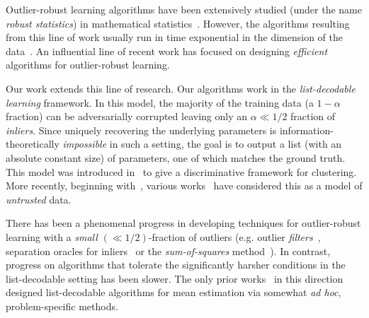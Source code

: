 \documentclass{article}
\theoremstyle{definition}
\theoremstyle{remark}
\numberwithin{equation}{section}
\newcommand{\1}{\bm{1}}
\begin{document}
Outlier-robust learning algorithms have been extensively studied (under the name \emph{robust statistics}) in mathematical statistics~\cite{MR0426989,maronna2006robust,huber2011robust,hampel2011robust}. However, the algorithms resulting from this line of work usually run in time exponential in the dimension of the data~\cite{bernholt2006robust}. An influential line of recent work \cite{journals/jmlr/KlivansLS09,journals/corr/AwasthiBL13, DBLP:journals/corr/DiakonikolasKKL16,DBLP:conf/focs/LaiRV16,DBLP:conf/stoc/CharikarSV17,KothariSteinhardt17,2017KS,HopkinsLi17,DBLP:journals/corr/DiakonikolasKK017a,DBLP:journals/corr/DiakonikolasKS17,DBLP:conf/colt/KlivansKM18} has focused on designing \emph{efficient} algorithms for outlier-robust learning. 

Our work extends this line of research. Our algorithms work in the \emph{list-decodable learning} framework. In this model, the majority of the training data (a $1 -\alpha$ fraction) can be adversarially corrupted leaving only an $\alpha \ll 1/2$ fraction of \emph{inliers}. Since uniquely recovering the underlying parameters is information-theoretically \emph{impossible} in such a setting, the goal is to output a list (with an absolute constant size) of parameters, one of which matches the ground truth. This model was introduced in~\cite{DBLP:conf/stoc/BalcanBV08} to give a discriminative framework for clustering. More recently, beginning with~\cite{DBLP:conf/stoc/CharikarSV17}, various works~\cite{DBLP:conf/stoc/DiakonikolasKS18,KothariSteinhardt17} have considered this as a model of \emph{untrusted} data. 

There has been a phenomenal progress in developing techniques for outlier-robust learning with a \emph{small} $(\ll 1/2)$-fraction of outliers (e.g. outlier \emph{filters}~\cite{DBLP:conf/focs/DiakonikolasKK016,DBLP:journals/corr/DiakonikolasKK017a}, separation oracles for inliers~\cite{DBLP:conf/focs/DiakonikolasKK016} or the \emph{sum-of-squares} method~\cite{2017KS,HopkinsLi17,KothariSteinhardt17,DBLP:conf/colt/KlivansKM18}). In contrast, progress on algorithms that tolerate the significantly harsher conditions in the list-decodable setting has been slower. The only prior works~\cite{DBLP:conf/stoc/CharikarSV17,DBLP:conf/stoc/DiakonikolasKS18,KothariSteinhardt17} in this direction designed list-decodable algorithms for mean estimation via somewhat \emph{ad hoc}, problem-specific methods. 
\end{document}
